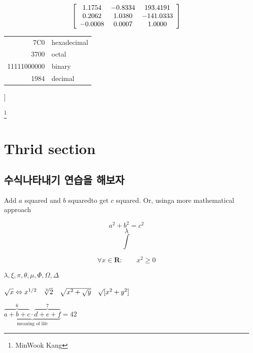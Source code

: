\documentclass[a4paper,12pt]{article} %
\begin{document}
\noindent

\vspace{5mm}
\[ \left[ \begin{array}{c c c}
1.1754 & -0.8334 & 193.4191\\
0.2062 & 1.0380 & -141.0333\\
-0.0008 & 0.0007 & 1.0000\\
\end{array}
\right] \]
\vspace{5mm}

\noindent

\vspace{5mm}
\noindent


\begin{tabular}{ |r|l| }
\hline
7C0 & hexadecimal \\
3700 & octal \\\cline{2-2}
11111000000 & binary \\
\hline \hline
1984 & decimal \\
\hline
\end{tabular}]

\vspace{5mm}

\footnote{MinWook Kang}

\clearpage

\section{Thrid section}
\subsection{수식나타내기 연습을 해보자} %

Add $a$ squared and $b$ squaredto get $c$ squared. Or, usinga more mathematical approach

$$a^2 + b^2 = c^2$$
$$\lambda$$
$$\int $$

$$\forall x \in \mathbf{R}:
\qquad x^{2} \geq 0$$
\vspace{5mm}

$\lambda,\xi,\pi,\theta,\mu,\Phi,\Omega,\Delta$
\vspace{5mm}

$\sqrt{x} \Leftrightarrow x^{1/2}\quad \sqrt[3]{2}\quad \sqrt{x^{2} + \sqrt{y}}\quad \surd[x^2 + y^2]$
\vspace{5mm}

$\underbrace{\overbrace{a+b+c}^6
\cdot \overbrace{d+e+f}^7}
_\text{meaning of life} = 42$
\vspace{5mm}
\end{document}
